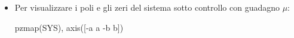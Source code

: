 \documentclass[10pt,a4paper]{book}
\begin{document}
\begin{itemize}
\item Per visualizzare i poli e gli zeri del sistema sotto controllo con guadagno $\mu $:

{\selectfont pzmap(SYS), axis([-a a -b b])}
\end{itemize}





\end{document}
